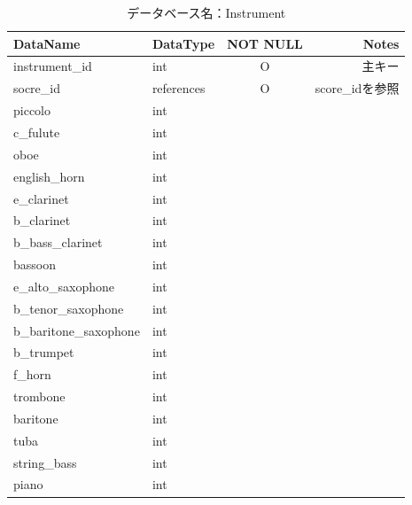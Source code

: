 \begin{table}[p]
    \caption{データベース名：Instrument}
    \begin{tabularx}{\textwidth}{llcR}
        \hline
        DataName               & DataType    & NOT NULL & Notes        \\
        \hline
        instrument\_id         & int         & O        & 主キー          \\
        socre\_id              & references  & O        & score\_idを参照 \\
        piccolo                & int         &          &              \\
        c\_fulute              & int         &          &              \\
        oboe                   & int         &          &              \\
        english\_horn          & int         &          &              \\
        e\_clarinet            & int         &          &              \\
        b\_clarinet            & int         &          &              \\
        b\_bass\_clarinet      & int         &          &              \\
        bassoon                & int         &          &              \\
        e\_alto\_saxophone     & int         &          &              \\
        b\_tenor\_saxophone    & int         &          &              \\
        b\_baritone\_saxophone & int         &          &              \\
        b\_trumpet             & int         &          &              \\
        f\_horn                & int         &          &              \\
        trombone               & int         &          &              \\
        baritone               & int         &          &              \\
        tuba                   & int         &          &              \\
        string\_bass           & int         &          &              \\
        piano                  & int         &          &              \\

\end{tabularx}
\end{table}
